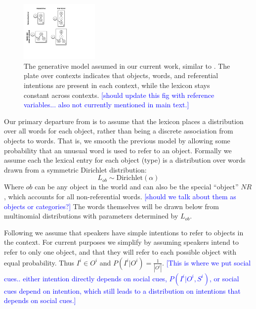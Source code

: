 \documentclass[man,noapacite,12pt]{apa2}
\newcommand{\nnote}[1]{\textcolor{blue}{[#1]}}
\begin{document}
\begin{figure}[tr]
\begin{center}
\includegraphics[width=1.5in]{figures/gen_mod.pdf}
\caption{\label{fig:genmod} The generative model assumed in our current work, similar to \protect{}. The plate over contexts indicates that objects, words, and referential intentions are present in each context, while the lexicon stays constant across contexts. \nnote{should update this fig with reference variables... also not currently mentioned in main text.}}
\end{center}
\end{figure}

Our primary departure from \cite{frank2009} is to assume that the lexicon places a distribution over all words for each object, rather than being a discrete association from objects to words. That is, we smooth the previous model by allowing some probability that an unusual word is used to refer to an object. Formally we assume each the lexical entry for each object (type) is a distribution over words drawn from a symmetric Dirichlet distribution:
\begin{equation}
L_{ob} \sim \text{Dirichlet}(\alpha)
\end{equation}
Where $ob$ can be any object in the world and can also be the special ``object'' $NR$, which accounts for all non-referential words. \nnote{should we talk about them as objects or categories?}
The words themselves will be drawn below from multinomial distributions with parameters determined by $L_{ob}$.

Following \cite{frank2009} we assume that speakers have simple intentions to refer to objects in the context. For current purposes we simplify by assuming speakers intend to refer to only one object, and that they will refer to each possible object with equal probability. Thus $I^{i} \in O^{i}$ and
$P(I^{i}| O^{i}) = \frac{1}{|O^{i}|}$.
\nnote{This is where we put social cues.. either intention directly depends on social cues, $P(I^{i}| O^{i},S^{i})$, or social cues depend on intention, which still leads to a distribution on intentions that depends on social cues.}
\end{document}
